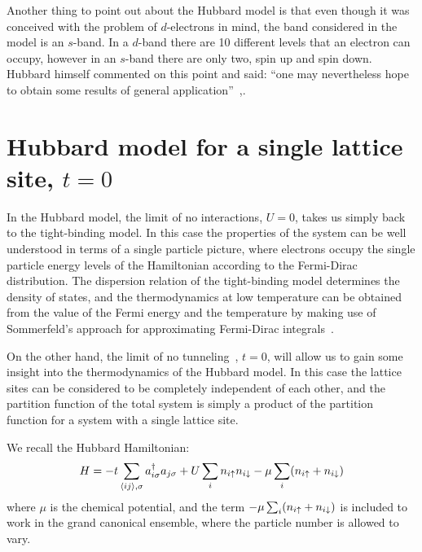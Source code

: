 Another thing to point out about the Hubbard model is that even though it was
conceived with the problem of $d$-electrons in mind, the band considered in the
model is an $s$-band. In a $d$-band there are 10 different levels that an
electron can occupy, however in an $s$-band there are only two, spin up and
spin down.  Hubbard himself commented on this point and said: ``one may
nevertheless hope to obtain some results of general
application''~\cite{Hubbard26111963},.  


\section{Hubbard model for a single lattice site, $t=0$}


In the Hubbard model, the limit of no interactions,  $U=0$, takes us simply
back to the tight-binding model.  In this case the properties of the system can
be well understood in terms of a single particle picture, where electrons
occupy the single particle energy levels of the Hamiltonian according to the
Fermi-Dirac distribution.  The dispersion relation of the tight-binding model
determines the density of states, and the thermodynamics at low temperature can
be obtained from the value of the Fermi energy and the temperature by making
use of Sommerfeld's approach for approximating Fermi-Dirac
integrals~\cite{ashcroft1976solid}.

On the other hand, the limit of no tunneling~\cite{Scalettar:hubbard7}, $t=0$,
will allow us to gain some insight into the thermodynamics of the Hubbard
model.  In this case the lattice sites can be considered to be completely
independent of each other, and the partition function of the total system is
simply a product of the partition function for a system with a single lattice
site.

We recall the Hubbard Hamiltonian:
\begin{equation}
  H =  
-t \sum_{ \langle ij \rangle, \sigma   } 
          a_{i\sigma}^{\dagger}a_{j\sigma} 
         + U\sum_{i} n_{i \uparrow } n_{i \downarrow}  
   - \mu \sum_{i}  ( n_{i \uparrow } + n_{i \downarrow} ) 
\end{equation}
where $\mu$ is the chemical potential, and the term $- \mu \sum_{i}  (
n_{i \uparrow } + n_{i \downarrow} ) $ is included to work in the grand
canonical ensemble, where the particle number is allowed to vary. 

